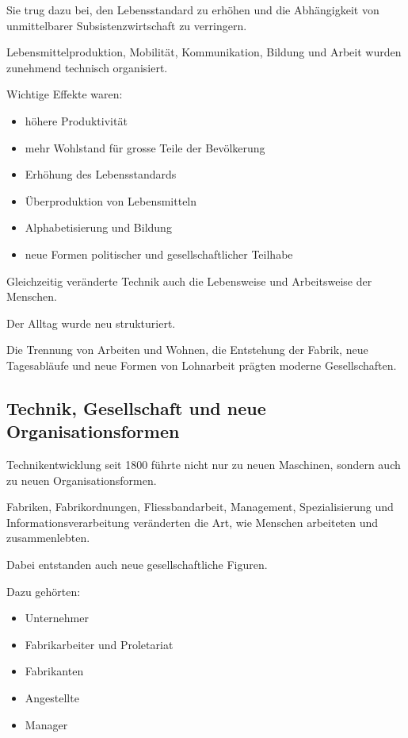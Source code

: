 Sie trug dazu bei,
den Lebensstandard zu erhöhen
und die Abhängigkeit von unmittelbarer Subsistenzwirtschaft zu verringern.

Lebensmittelproduktion,
Mobilität,
Kommunikation,
Bildung und Arbeit wurden zunehmend technisch organisiert.

Wichtige Effekte waren:

\begin{itemize}
\item höhere Produktivität
\item mehr Wohlstand für grosse Teile der Bevölkerung
\item Erhöhung des Lebensstandards
\item Überproduktion von Lebensmitteln
\item Alphabetisierung und Bildung
\item neue Formen politischer und gesellschaftlicher Teilhabe
\end{itemize}

Gleichzeitig veränderte Technik auch die Lebensweise
und Arbeitsweise der Menschen.

Der Alltag wurde neu strukturiert.

Die Trennung von Arbeiten und Wohnen,
die Entstehung der Fabrik,
neue Tagesabläufe
und neue Formen von Lohnarbeit
prägten moderne Gesellschaften.

\subsection{Technik, Gesellschaft und neue Organisationsformen}

Technikentwicklung seit 1800 führte nicht nur
zu neuen Maschinen,
sondern auch zu neuen Organisationsformen.

Fabriken,
Fabrikordnungen,
Fliessbandarbeit,
Management,
Spezialisierung
und Informationsverarbeitung
veränderten die Art,
wie Menschen arbeiteten und zusammenlebten.

Dabei entstanden auch neue gesellschaftliche Figuren.

Dazu gehörten:

\begin{itemize}
\item Unternehmer
\item Fabrikarbeiter und Proletariat
\item Fabrikanten
\item Angestellte
\item Manager
\end{itemize}

